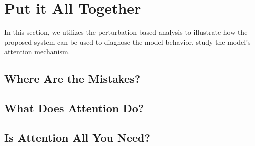 \section{Put it All Together}
In this section, we utilizes the perturbation based analysis
to illustrate how the proposed system can be used
to diagnose the model behavior, study the model's attention mechanism.

\subsection{Where Are the Mistakes?}


\subsection{What Does Attention Do?}


\subsection{Is Attention All You Need?}
